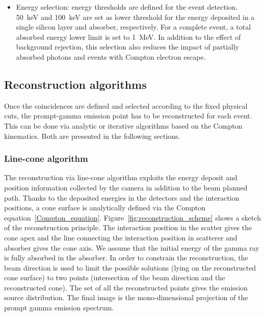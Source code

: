 \begin{itemize}
\item Energy selection: energy thresholds are defined for the event detection. 50~keV and 100~keV are set as lower threshold for the energy deposited in a single silicon layer and absorber, respectively. For a complete event, a total absorbed energy lower limit is set to 1~MeV. In addition to the effect of background rejection, this selection also reduces the impact of partially absorbed photons and events with Compton electron escape.

\end{itemize}

\subsection{Reconstruction algorithms}
\label{MatMeth:reconstruction}
Once the coincidences are defined and selected according to the fixed physical cuts, the prompt-gamma emission point has to be reconstructed for each event. This can be done via analytic or iterative algorithms based on the Compton kinematics. Both are presented in the following sections.


\subsubsection{Line-cone algorithm}
The reconstruction via line-cone algorithm exploits the energy deposit and position information collected by the camera in addition to the beam planned path. Thanks to the deposited energies in the detectors and the interaction positions, a cone surface is analytically defined via the Compton equation~\ref{Compton_equation}. Figure~\ref{fig:reconstruction_scheme} shows a sketch of the reconstruction principle. The interaction position in the scatter gives the cone apex and the line connecting the interaction position in scatterer and absorber gives the cone axis. We assume that the initial energy of the gamma ray is fully absorbed in the absorber. In order to constrain the reconstruction, the beam direction is used to limit the possible solutions (lying on the reconstructed cone surface) to two points (intersection of the beam direction and the reconstructed cone). The set of all the reconstructed points gives the emission source distribution. The final image is the mono-dimensional projection of the prompt gamma emission spectrum. 

